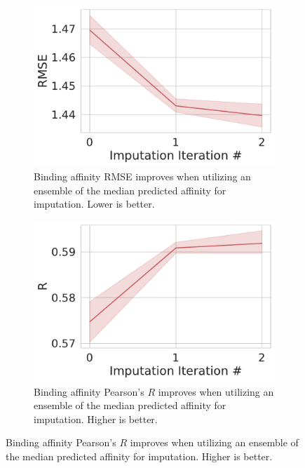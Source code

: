 \documentclass[journal=jmcmar,manuscript=article]{achemso}
\begin{document}
\begin{figure}[tbph]
    \centering
    \begin{subfigure}[t]{0.48\textwidth}
        \centering
        \includegraphics[width=\linewidth]{figures/MedGOEnsRMSE.pdf}
        \caption{Binding affinity RMSE improves when utilizing an ensemble of the median predicted affinity for imputation. Lower is better.}
    \end{subfigure}
    \hfill
    \begin{subfigure}[t]{0.48\textwidth}
        \centering
        \includegraphics[width=\linewidth]{figures/MedGOEnsR.pdf}
        \caption{Binding affinity Pearson's $R$ improves when utilizing an ensemble of the median predicted affinity for imputation. Higher is better.}
    \end{subfigure}


\end{figure}
\end{document}
